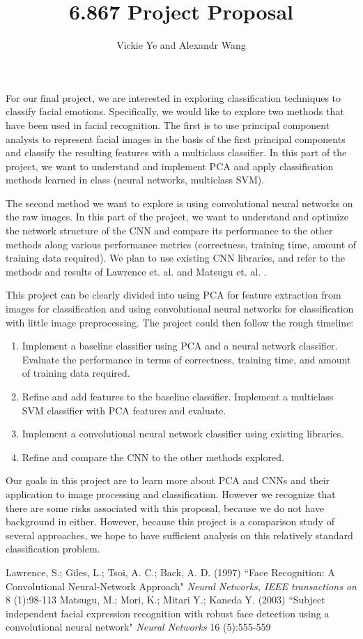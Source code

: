 \documentclass[11pt, twoside]{article}
\title{6.867 Project Proposal}
\date{}
\author {Vickie Ye and Alexandr Wang}
\begin{document}
\maketitle

For our final project, we are interested in exploring classification
techniques to classify facial emotions. Specifically, we would like
to explore two methods that have been used in facial recognition.
The first is to use principal component analysis to represent facial
images in the basis of the first principal components and classify the
resulting features with a multiclass classifier. In this part of the
project, we want to understand and implement PCA and apply
classification methods learned in class (neural networks, multiclass SVM).

The second method we want to explore is using convolutional neural networks
on the raw images. In this part of the project, we want to understand
and optimize the network structure of the CNN and compare its performance
to the other methods along various performance metrics (correctness, training
time, amount of training data required). We plan to use existing CNN libraries,
and refer to the methods and results of Lawrence et. al. \cite{Lawrence} and
Matsugu et. al. \cite{Matsugu}.

This project can be clearly divided into using PCA for feature
extraction from images for classification and using convolutional
neural networks for classification with little image preprocessing.
The project could then follow the rough timeline:
\begin{enumerate}
\item Implement a baseline classifier using PCA and a neural network
classifier. Evaluate the performance in terms of correctness, training time,
and amount of training data required.
\item Refine and add features to the baseline classifier. Implement a
multiclass SVM classifier with PCA features and evaluate.
\item Implement a convolutional neural network classifier using existing
libraries.
\item Refine and compare the CNN to the other methods explored.
\end{enumerate}

Our goals in this project are to learn more about PCA and CNNs and their
application to image processing and classification. However we recognize
that there are some risks associated with this proposal, because we do
not have background in either. However, because this project is a
comparison study of several approaches, we hope to have sufficient
analysis on this relatively standard classification problem.

\begin{thebibliography}{9}
Lawrence, S.; Giles, L.; Tsoi, A. C.; Back, A. D. (1997)
``Face Recognition: A Convolutional Neural-Network Approach"
\textit{Neural Networks, IEEE transactions on} 8 (1):98-113
Matsugu, M.; Mori, K.; Mitari Y.; Kaneda Y. (2003)
``Subject independent facial expression recognition with robust face detection using a convolutional neural network"
\textit{Neural Networks} 16 (5):555-559
\end{thebibliography}
\end{document}
